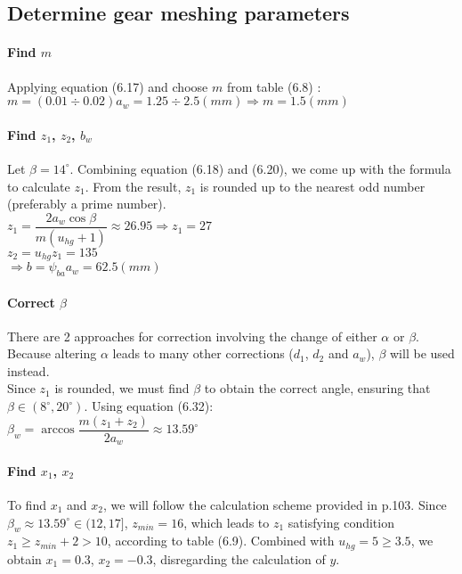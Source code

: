 \subsection{Determine gear meshing parameters}

\paragraph{Find $ m $} Applying equation (6.17)  and choose $ m $ from table (6.8) :\\
$ m = (0.01\div0.02)a_w = 1.25\div2.5 \unit{(mm)} \Rightarrow m=1.5\unit{(mm)}$

\paragraph{Find $ z_1 $, $ z_2 $, $ b_w $} Let $ \beta = 14^\circ $. Combining equation (6.18) and (6.20), we come up with the formula to calculate $ z_1 $. From the result, $ z_1 $ is rounded up to the nearest odd number (preferably a prime number).\\
$ z_1 = \dfrac{2a_w\cos\beta}{m(u_{hg}+1)} \approx 26.95 \Rightarrow z_1 = 27$\\
$ z_2 = u_{hg}z_1 = 135 $\\
$ \Rightarrow b = \psi_{ba}a_w = 62.5\unit{(mm)}$ 

\paragraph{Correct $ \beta $} There are 2 approaches for correction involving the change of either $ \alpha $ or $ \beta $. Because altering $ \alpha $ leads to many other corrections ($ d_1 $, $ d_2 $ and $ a_w $), $ \beta $ will be used instead.\\
Since $ z_1 $ is rounded, we must find $ \beta $ to obtain the correct angle, ensuring that $ \beta \in (8^\circ, 20^\circ) $. Using equation (6.32):\\
$ \beta_w = \arccos\dfrac{m(z_1+z_2)}{2a_w} \approx 13.59^\circ$

\paragraph{Find $ x_1 $, $ x_2 $} To find $ x_1 $ and $ x_2 $, we will follow the calculation scheme provided in p.103. Since $ \beta_w \approx 13.59^\circ \in (12,17]$, $ z_{min} = 16$, which leads to $ z_1 $ satisfying condition $ z_1 \geq z_{min} + 2 > 10 $, according to table (6.9). Combined with $ u_{hg} = 5 \geq 3.5 $, we obtain $ x_1 = 0.3 $, $ x_2 = -0.3 $, disregarding the calculation of $ y $.


